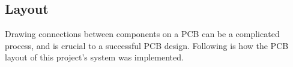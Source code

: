 \subsection{Layout}

Drawing connections between components on a PCB can be a complicated process,
and is crucial to a successful PCB design. Following is how the PCB layout
of this project's system was implemented.



